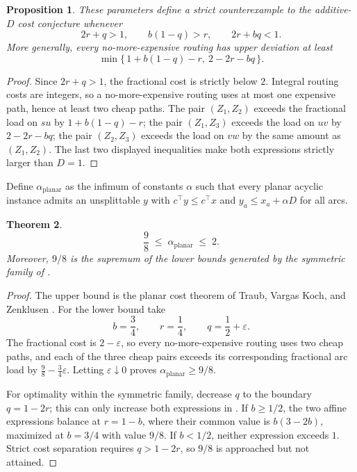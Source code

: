 \documentclass[11pt]{article}
\newtheorem{theorem}{Theorem}[section]
\newtheorem{proposition}[theorem]{Proposition}
\theoremstyle{definition}
\newcommand{\eps}{\varepsilon}
\begin{document}
\begin{proposition}\label{prop:parametric}
These parameters define a strict counterexample to the additive-$D$ cost
conjecture whenever
\[
 2r+q>1,\qquad b(1-q)>r,\qquad 2r+bq<1.
\]
More generally, every no-more-expensive routing has upper deviation at least
\[
 \min\{\,1+b(1-q)-r,\ 2-2r-bq\,\}.
\]
\end{proposition}
\begin{proof}
Since $2r+q>1$, the fractional cost is strictly below $2$.  Integral routing
costs are integers, so a no-more-expensive routing uses at most one expensive
path, hence at least two cheap paths.  The pair $(Z_1,Z_2)$ exceeds the
fractional load on $su$ by $1+b(1-q)-r$; the pair $(Z_1,Z_3)$ exceeds the
load on $uv$ by $2-2r-bq$; the pair $(Z_2,Z_3)$ exceeds the load on $vw$ by
the same amount as $(Z_1,Z_2)$.  The last two displayed inequalities make
both expressions strictly larger than $D=1$.
\end{proof}

Define $\alpha_{\mathrm{planar}}$ as the infimum of constants $\alpha$ such
that every planar acyclic instance admits an unsplittable $y$ with
$c^\top y\le c^\top x$ and $y_a\le x_a+\alpha D$ for all arcs.

\begin{theorem}\label{thm:nine-eighths}
\[
 \frac98\;\le\;\alpha_{\mathrm{planar}}\;\le\;2 .
\]
Moreover, $9/8$ is the supremum of the lower bounds generated by the
symmetric family of .
\end{theorem}
\begin{proof}
The upper bound is the planar cost theorem of Traub, Vargas Koch, and
Zenklusen \cite{TraubVargasKochZenklusen2024}.  For the lower bound take
\[
 b=\frac34,\qquad r=\frac14,\qquad q=\frac12+\eps .
\]
The fractional cost is $2-\eps$, so every no-more-expensive routing uses two
cheap paths, and each of the three cheap pairs exceeds its corresponding
fractional arc load by $\tfrac98-\tfrac34\eps$.  Letting $\eps\downarrow0$
proves $\alpha_{\mathrm{planar}}\ge9/8$.

For optimality within the symmetric family, decrease $q$ to the boundary
$q=1-2r$; this can only increase both expressions in
.  If $b\ge1/2$, the two affine expressions balance at
$r=1-b$, where their common value is $b(3-2b)$, maximized at $b=3/4$ with
value $9/8$.  If $b<1/2$, neither expression exceeds $1$.  Strict cost
separation requires $q>1-2r$, so $9/8$ is approached but not attained.
\end{proof}
\end{document}
